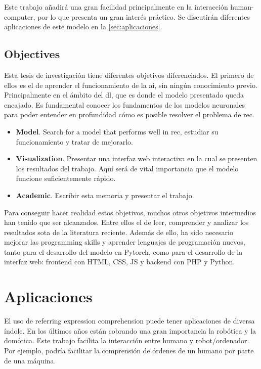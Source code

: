 Este trabajo añadirá una gran facilidad principalmente en la interacción
human-computer, por lo que presenta un gran interés práctico. Se discutirán
diferentes aplicaciones de este modelo en la \vref{sec:aplicaciones}.

\subsection{Objectives}

Esta tesis de investigación tiene diferentes objetivos diferenciados. El
primero de ellos es el de aprender el funcionamiento de la \gls{ai}, sin ningún
conocimiento previo. Principalmente en el ámbito del \gls{dl}, que es donde el
modelo presentado queda encajado. Es fundamental conocer los fundamentos de los
modelos neuronales para poder entender en profundidad cómo es posible resolver
el problema de \gls{rec}.

\begin{itemize}
  \item \textbf{Model}. Search for a model that performs well in \gls{rec},
  estudiar su funcionamiento y tratar de mejorarlo.
  \item \textbf{Visualization}. Presentar una interfaz web interactiva en la
  cual se presenten los resultados del trabajo. Aquí será de vital importancia
  que el modelo funcione suficientemente rápido.
  \item \textbf{Academic}. Escribir esta memoria y presentar el trabajo.
\end{itemize}

Para conseguir hacer realidad estos objetivos, muchos otros objetivos
intermedios han tenido que ser alcanzados. Entre ellos el de leer, comprender y
analizar los resultados \gls{sota} de la literatura reciente. Además de ello,
ha sido necesario mejorar las programming skills y aprender lenguajes de
programación nuevos, tanto para el desarrollo del modelo en Pytorch, como para
el desarrollo de la interfaz web: frontend con HTML, CSS, JS y backend con PHP
y Python.


\section{Aplicaciones} \label{sec:aplicaciones}

El uso de referring expression comprehension puede tener aplicaciones de
diversa índole. En los últimos años están cobrando una gran importancia la
robótica y la domótica. Este trabajo facilita la interacción entre humano y
robot/ordenador. Por ejemplo, podría facilitar la comprensión de órdenes de un
humano por parte de una máquina.

